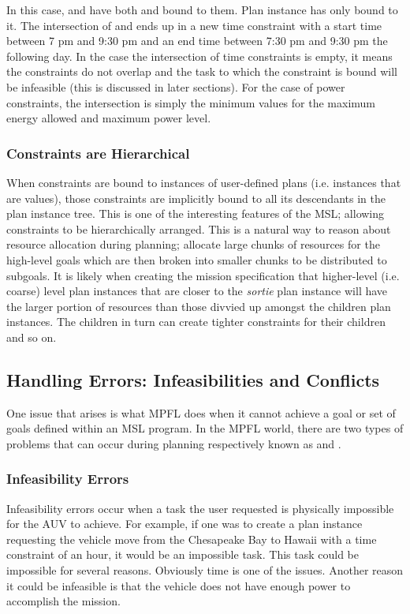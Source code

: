 In this case,  and  have both  and  bound to them. Plan instance  has only  bound to it. The intersection of  and  ends up in a new time constraint with a start time between 7 pm and 9:30 pm and an end time between 7:30 pm and 9:30 pm the following day. In the case the intersection of time constraints is empty, it means the constraints do not overlap and the task to which the constraint is bound will be infeasible (this is discussed in later sections). For the case of power constraints, the intersection is simply the minimum values for the maximum energy allowed and maximum power level.

\subsubsection{Constraints are Hierarchical}
When constraints are bound to instances of user-defined plans (i.e. instances that are  values), those constraints are implicitly bound to all its descendants in the plan instance tree. This is one of the interesting features of the MSL; allowing constraints to be hierarchically arranged. This is a natural way to reason about resource allocation during planning; allocate large chunks of resources for the high-level goals which are then broken into smaller chunks to be distributed to subgoals. It is likely when creating the mission specification that higher-level (i.e. coarse) level plan instances that are closer to the \emph{sortie} plan instance will have the larger portion of resources than those divvied up amongst the children plan instances. The children in turn can create tighter constraints for their children and so on. 

\subsection{Handling Errors: Infeasibilities and Conflicts}
One issue that arises is what MPFL does when it cannot achieve a goal or set of goals defined within an MSL program. In the MPFL world, there are two types of problems that can occur during planning respectively known as  and .

\subsubsection{Infeasibility Errors}
Infeasibility errors occur when a task the user requested is physically impossible for the AUV to achieve. For example, if one was to create a  plan instance requesting the vehicle move from the Chesapeake Bay to Hawaii with a time constraint of an hour, it would be an impossible task. This task could be impossible for several reasons. Obviously time is one of the issues. Another reason it could be infeasible is that the vehicle does not have enough power to accomplish the mission.

